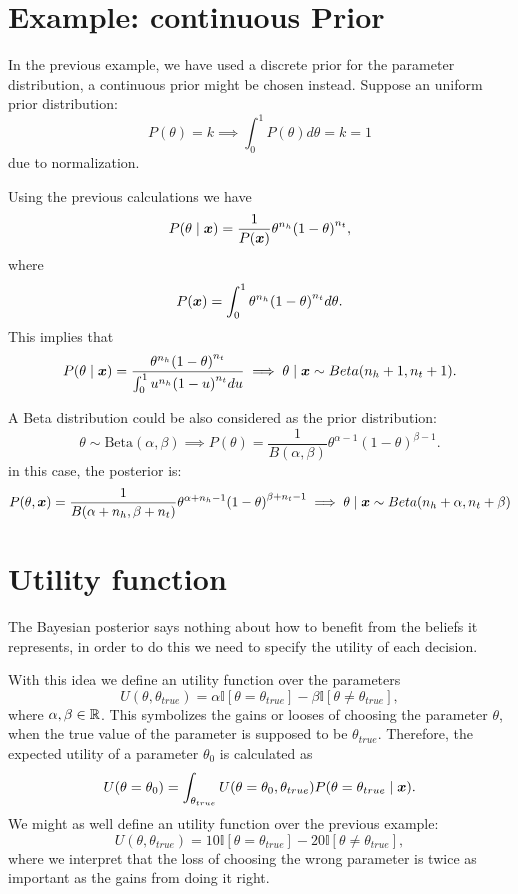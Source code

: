 \section{Example: continuous Prior}

In the previous example, we have used a discrete prior for the parameter distribution, a continuous prior might be chosen instead. Suppose an uniform prior distribution:
\[
P(\theta) = k \implies \int_0^1 P(\theta) d\theta = k = 1
\]
due to normalization.

Using the previous calculations we have
\[
  P(\theta \mid  \bm{x}) = \frac{1}{P(\bm{x})} \theta^{n_h}{(1-\theta)}^{n_t},
\]
where
\[
  P(\bm{x}) = \int_0^1 \theta^{n_h}{(1-\theta)}^{n_t} d\theta.
\]
This implies that
\[
  P(\theta \mid \bm{x}) = \frac{\theta^{n_h}{(1-\theta)}^{n_t} }{ \int_0^1 u^{n_h}{(1-u)}^{n_t} du} \implies \theta \mid \bm{x} \sim Beta(n_h + 1, n_t + 1).
\]

A Beta distribution could be also considered as the prior distribution:
\[
  \theta \sim \text{Beta}(\alpha, \beta) \implies P(\theta) = \frac{1}{B(\alpha, \beta)}\theta^{\alpha - 1}{(1 - \theta)}^{\beta - 1}.
\]
in this case, the posterior is:
\[
  P(\theta, \bm{x}) = \frac{1}{B(\alpha + n_h, \beta + n_t)}\theta^{\alpha
    + n_h - 1}{(1 - \theta)}^{\beta + n_t - 1} \implies \theta \mid \bm{x} \sim Beta(n_h + \alpha, n_t + \beta)
\]

\section{Utility function}

The Bayesian posterior says nothing about how to benefit from the beliefs it
represents, in order to do this we need to specify the utility of each decision.

With this idea we define an utility function over the parameters
\[
  U(\theta, \theta_{true}) = \alpha \mathbb{I}[\theta = \theta_{true}] - \beta
  \mathbb{I}[\theta \neq \theta_{true}],
\]
where \(\alpha, \beta \in \mathbb{R}\). This symbolizes the gains or looses of choosing
the parameter \(\theta\), when the true value of the parameter is supposed to be
\(\theta_{true}\). Therefore, the expected utility of a parameter \(\theta_0\) is
calculated as
\[
  U(\theta = \theta_0) = \int_{\theta_{true}}U(\theta = \theta_0,
  \theta_{true})P(\theta = \theta_{true}  \mid  \bm{x}).
\]
We might as well define an utility function over the previous example:
\[
  U(\theta, \theta_{true}) = 10\mathbb{I}[\theta = \theta_{true}] - 20
  \mathbb{I}[\theta \neq \theta_{true}],
\]
where we interpret that the loss of choosing the wrong parameter is twice as
important as the gains from doing it right.

